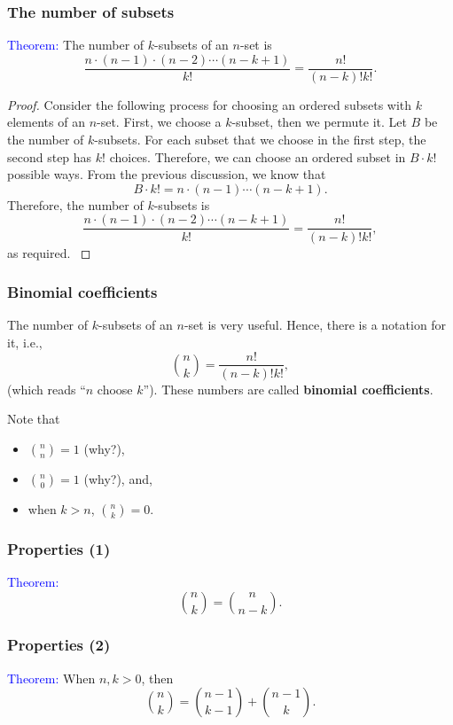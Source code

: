 \begin{frame}\frametitle{The number of subsets}
  \begin{tcolorbox}
    \textcolor{blue}{Theorem:}
    The number of $k$-subsets of an $n$-set is
    \[\frac{n\cdot(n-1)\cdot(n-2)\cdots(n-k+1)}{k!}=\frac{n!}{(n-k)!k!}.\]
  \end{tcolorbox}
  
  \begin{proof} {\small
    \pause Consider the following process for choosing an ordered
    subsets with $k$ elements of an $n$-set.  \pause First, we choose
    a $k$-subset, then we permute it.  Let $B$ be the number of
    $k$-subsets.  For each subset that we choose in the first step,
    the second step has $k!$ choices.  \pause Therefore, we can choose
    an ordered subset in $B\cdot k!$ possible ways.  \pause From the
    previous discussion, we know that
    \[
    B\cdot k! = n\cdot(n-1)\cdots(n-k+1).
    \]
    Therefore, the number of $k$-subsets is
    \[\frac{n\cdot(n-1)\cdot(n-2)\cdots(n-k+1)}{k!}=\frac{n!}{(n-k)!k!},\]
    as required.
    }
  \end{proof}
\end{frame}

\begin{frame}\frametitle{Binomial coefficients}
  The number of $k$-subsets of an $n$-set is very useful.  Hence,
  there is a notation for it, i.e.,
  \[
  {n\choose k} = \frac{n!}{(n-k)!k!},
  \]
  (which reads ``$n$ choose $k$'').  These numbers are called {\bf
    binomial coefficients}. \pause

  \vspace{0.1in}
  
  Note that
  \begin{itemize}
  \item ${n\choose n}=1$ (why?), \pause
  \item ${n\choose 0}=1$ (why?), \pause and,
  \item when $k>n$, ${n\choose k}=0$.
  \end{itemize}
\end{frame}

\begin{frame}\frametitle{Properties (1)}
  \textcolor{blue}{Theorem:} $${n\choose k}={n\choose n-k}.$$

  \vspace{2.5in}
\end{frame}

\begin{frame}\frametitle{Properties (2)}
  \textcolor{blue}{Theorem:} When $n,k>0$, then
  $${n\choose k}={n-1\choose k-1} + {n-1\choose k}.$$

  \vspace{2.5in}
\end{frame}

